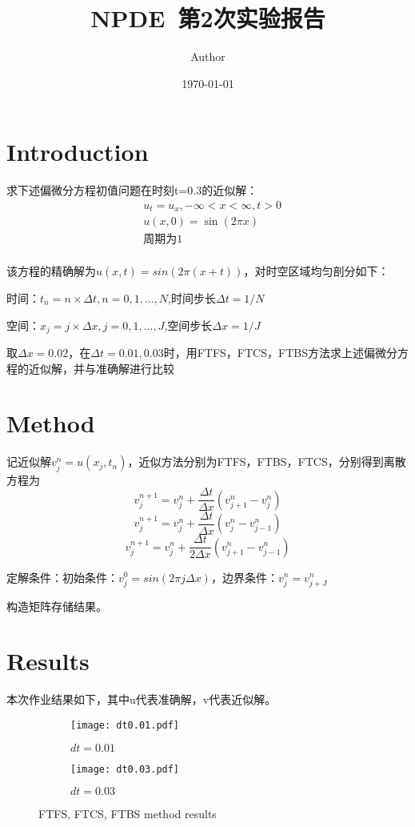 \documentclass{article}
\title{NPDE~第2次实验报告}
\author{Author}
\date{\today}
\begin{document}
\maketitle

\section{Introduction}

求下述偏微分方程初值问题在时刻t=0.3的近似解：
$$
\begin{aligned}
  & u_t=u_x,-\infty<x<\infty,t>0 \\
  & u(x,0)=\sin(2\pi x)           \\
  & \text{周期为1}                  \\
\end{aligned}
$$

该方程的精确解为$u(x,t)=sin(2\pi(x+t))$，对时空区域均匀剖分如下：

时间：$t_n=n\times \Delta t,n=0,1,...,N$,时间步长$\Delta t=1/N$

空间：$x_j=j\times \Delta x,j=0,1,...,J$,空间步长$\Delta x=1/J$

取$\Delta x =0.02$，在$\Delta t=0.01,0.03$时，用FTFS，FTCS，FTBS方法求上述偏微分方程的近似解，并与准确解进行比较
\section{Method}

记近似解$v_j^n=u(x_j,t_n)$，近似方法分别为FTFS，FTBS，FTCS，分别得到离散方程为
$$v_j^{n+1}=v_j^n+\frac{\Delta t}{\Delta x}(v_{j+1}^n-v_{j}^n)$$
$$v_j^{n+1}=v_j^n+\frac{\Delta t}{\Delta x}(v_{j}^n-v_{j-1}^n)$$
$$v_j^{n+1}=v_j^n+\frac{\Delta t}{2\Delta x}(v_{j+1}^n-v_{j-1}^n)$$

定解条件：初始条件：$v_j^0=sin(2\pi j\Delta x)$，边界条件：$v_j^n=v_{j+J}^n$

构造矩阵存储结果。
\section{Results}

本次作业结果如下，其中u代表准确解，v代表近似解。

\begin{figure}[H]
  \centering
  \begin{subfigure}[b]{0.47\textwidth}
    \centering
    \texttt{[image: dt0.01.pdf]}
    \caption{$dt=0.01$}

  \end{subfigure}
  \begin{subfigure}[b]{0.47\textwidth}
    \centering
    \texttt{[image: dt0.03.pdf]}
    \caption{$dt=0.03$}

  \end{subfigure}
  \caption{FTFS, FTCS, FTBS method results}
\end{figure}
\end{document}
